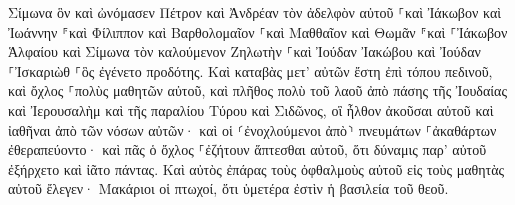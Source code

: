 \documentclass{openreader}
\begin{document}
Σίμωνα ὃν καὶ ὠνόμασεν Πέτρον καὶ Ἀνδρέαν τὸν ἀδελφὸν αὐτοῦ ⸀καὶ Ἰάκωβον καὶ Ἰωάννην ⸁καὶ Φίλιππον καὶ Βαρθολομαῖον 
⸀καὶ Μαθθαῖον καὶ Θωμᾶν ⸁καὶ ⸀Ἰάκωβον Ἁλφαίου καὶ Σίμωνα τὸν καλούμενον Ζηλωτὴν 
⸀καὶ Ἰούδαν Ἰακώβου καὶ Ἰούδαν ⸀Ἰσκαριὼθ ⸀ὃς ἐγένετο προδότης. 
Καὶ καταβὰς μετ’ αὐτῶν ἔστη ἐπὶ τόπου πεδινοῦ, καὶ ὄχλος ⸀πολὺς μαθητῶν αὐτοῦ, καὶ πλῆθος πολὺ τοῦ λαοῦ ἀπὸ πάσης τῆς Ἰουδαίας καὶ Ἰερουσαλὴμ καὶ τῆς παραλίου Τύρου καὶ Σιδῶνος, 
οἳ ἦλθον ἀκοῦσαι αὐτοῦ καὶ ἰαθῆναι ἀπὸ τῶν νόσων αὐτῶν· καὶ οἱ ⸂ἐνοχλούμενοι ἀπὸ⸃ πνευμάτων ⸀ἀκαθάρτων ἐθεραπεύοντο· 
καὶ πᾶς ὁ ὄχλος ⸀ἐζήτουν ἅπτεσθαι αὐτοῦ, ὅτι δύναμις παρ’ αὐτοῦ ἐξήρχετο καὶ ἰᾶτο πάντας. 
Καὶ αὐτὸς ἐπάρας τοὺς ὀφθαλμοὺς αὐτοῦ εἰς τοὺς μαθητὰς αὐτοῦ ἔλεγεν· Μακάριοι οἱ πτωχοί, ὅτι ὑμετέρα ἐστὶν ἡ βασιλεία τοῦ θεοῦ. 
\end{document}
